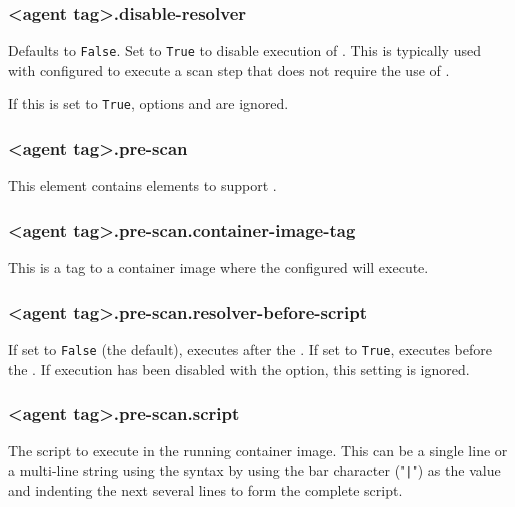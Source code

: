 \subsubsection{<agent tag>.disable-resolver}\label{sec:agent-disable-resolver}
Defaults to \texttt{False}.  Set to \texttt{True} to disable execution of \scaresolver.  This is typically used with 
 configured to execute a scan step that does not require the use of \scaresolver.

If this is set to \texttt{True}, options  and 
 are ignored.


\subsubsection{<agent tag>.pre-scan}\label{sec:agent-pre-scan}
This element contains elements to support .

\subsubsection{<agent tag>.pre-scan.container-image-tag}\label{sec:agent-pre-scan-container-image-tag}
This is a tag to a container image where the configured  will execute.

\subsubsection{<agent tag>.pre-scan.resolver-before-script}\label{sec:agent-pre-scan-resolver-before-script}
If set to \texttt{False} (the default), \scaresolver executes after the .
If set to \texttt{True}, \scaresolver executes before the . If \scaresolver
execution has been disabled with the  option, this setting is ignored.


\subsubsection{<agent tag>.pre-scan.script}\label{sec:agent-pre-scan-script}
The script to execute in the running container image.  This can be a single line or a multi-line
string using the  syntax
by using the bar character ("\texttt{|}") as the value and indenting the next several lines to form the
complete script.


